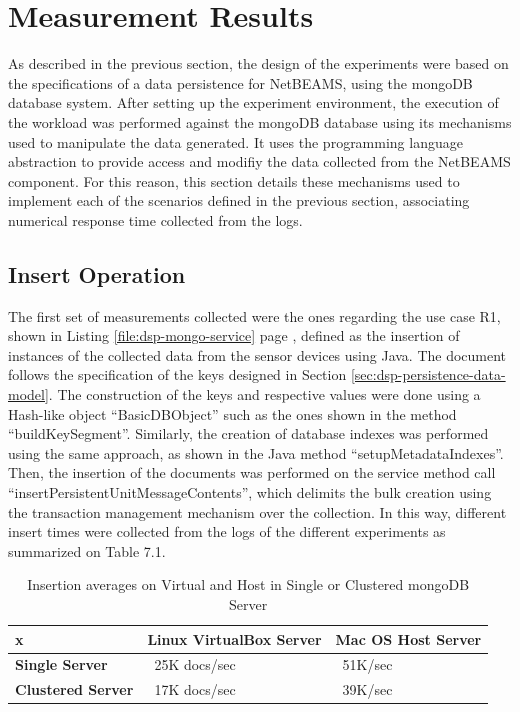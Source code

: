 \section{Measurement Results}
\label{sec:exp-measurements}

As described in the previous section, the design of the experiments were based
on the specifications of a data persistence for NetBEAMS, using the mongoDB
database system. After setting up the experiment environment, the execution of
the workload was performed against the mongoDB database using its mechanisms
used to manipulate the data generated. It uses the programming language
abstraction to provide access and modifiy the data collected from the NetBEAMS
component. For this reason, this section details these mechanisms used to
implement each of the scenarios defined in the previous section, associating
numerical response time collected from the logs.

\subsection{Insert Operation}

The first set of measurements collected were the ones regarding the use case
R1, shown in Listing \ref{file:dsp-mongo-service} page
\pageref{file:dsp-mongo-service}, defined as the insertion of instances of the
collected data from the sensor devices using Java. The document follows the
specification of the keys designed in Section
\ref{sec:dsp-persistence-data-model}. The construction of the keys and
respective values were done using a Hash-like object ``BasicDBObject'' such as
the ones shown in the method ``buildKeySegment''. Similarly, the creation of
database indexes was performed using the same approach, as shown in the Java
method ``setupMetadataIndexes''. Then, the insertion of the documents was
performed on the service method call ``insertPersistentUnitMessageContents'',
which delimits the bulk creation using the transaction management mechanism
over the collection. In this way, different insert times were collected from
the logs of the different experiments as summarized on Table 7.1.

\begin{table}[!h]
    \begin{center}
        \begin{tabular}{|p{100pt}|p{100pt}|p{100pt}|}\hline
           x & \textbf{Linux VirtualBox Server} & \textbf{Mac OS Host Server}\\\hline 
           \textbf{Single Server} & ~25K docs/sec & ~51K/sec \\\hline
           \textbf{Clustered Server} & ~17K docs/sec & ~39K/sec \\\hline
        \end{tabular}
        \caption{Insertion averages on Virtual and Host in Single or Clustered
        mongoDB Server}
    \end{center}
    \label{tab:experiment-insert-avarage}
\end{table}

